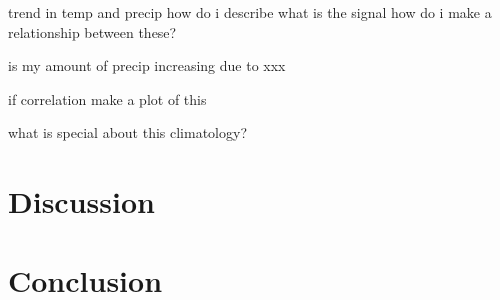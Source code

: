 \documentclass[draft]{agujournal2019}
\begin{document}
trend in temp and precip 
how do i describe
what is the signal
how do i make a relationship between these?

is my amount of precip increasing due to xxx

if correlation make a plot of this 


what is special about this climatology?




\section{Discussion}

\section{Conclusion}



%
%

%


%
%
%
%
\end{document}
